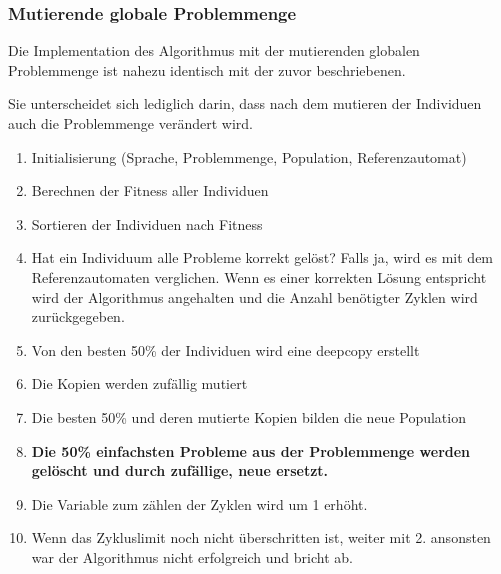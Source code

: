 \subsubsection{Mutierende globale Problemmenge}
Die Implementation des Algorithmus mit der mutierenden globalen Problemmenge ist nahezu identisch mit der zuvor beschriebenen.

Sie unterscheidet sich lediglich darin, dass nach dem mutieren der Individuen auch die Problemmenge verändert wird.

\begin{enumerate}
\item Initialisierung (Sprache, Problemmenge, Population, Referenzautomat)
\item Berechnen der Fitness aller Individuen
\item Sortieren der Individuen nach Fitness
\item Hat ein Individuum alle Probleme korrekt gelöst? Falls ja, wird es mit dem Referenzautomaten verglichen. Wenn es einer korrekten Lösung entspricht wird der Algorithmus angehalten und die Anzahl benötigter Zyklen wird zurückgegeben.
\item Von den besten 50\% der Individuen wird eine \Gls{deepcopy} erstellt
\item Die Kopien werden zufällig mutiert
\item Die besten 50\% und deren mutierte Kopien bilden die neue Population
\item \textbf{Die 50\% einfachsten Probleme aus der Problemmenge werden gelöscht und durch zufällige, neue ersetzt.}
\item Die Variable zum zählen der Zyklen wird um 1 erhöht.
\item Wenn das Zykluslimit noch nicht überschritten ist, weiter mit 2. ansonsten war der Algorithmus nicht erfolgreich und bricht ab.
\end{enumerate}